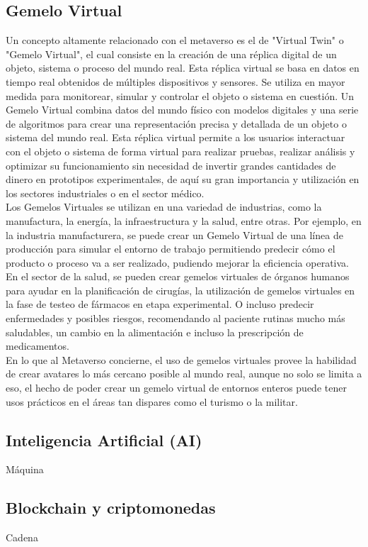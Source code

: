 \documentclass[a4paper,10pt]{article}
\begin{document}
	\subsection{Gemelo Virtual}
	Un concepto altamente relacionado con el metaverso es el de "Virtual Twin" o "Gemelo Virtual", el cual consiste en la creación de una réplica digital de un objeto, sistema o proceso del mundo real. Esta réplica virtual se basa en datos en tiempo real obtenidos de múltiples dispositivos y sensores. Se utiliza en mayor medida para monitorear, simular y controlar el objeto o sistema en cuestión.
	Un Gemelo Virtual combina datos del mundo físico con modelos digitales y una serie de algoritmos para crear una representación precisa y detallada de un objeto o sistema del mundo real. Esta réplica virtual permite a los usuarios interactuar con el objeto o sistema de forma virtual para realizar pruebas, realizar análisis y optimizar su funcionamiento sin necesidad de invertir grandes cantidades de dinero en prototipos experimentales, de aquí su gran importancia y utilización en los sectores industriales o en el sector médico.
	\\ Los Gemelos Virtuales se utilizan en una variedad de industrias, como la manufactura, la energía, la infraestructura y la salud, entre otras. Por ejemplo, en la industria manufacturera, se puede crear un Gemelo Virtual de una línea de producción para simular el entorno de trabajo permitiendo predecir cómo el producto o proceso va a ser realizado, pudiendo mejorar la eficiencia operativa. En el sector de la salud, se pueden crear gemelos virtuales de órganos humanos para ayudar en la planificación de cirugías, la utilización de gemelos virtuales en la fase de testeo de fármacos en etapa experimental. O incluso predecir enfermedades y posibles riesgos, recomendando al paciente rutinas mucho más saludables, un cambio en la alimentación e incluso la prescripción de medicamentos.
	\\ En lo que al Metaverso concierne, el uso de gemelos virtuales provee la habilidad de crear avatares lo más cercano posible al mundo real, aunque no solo se limita a eso, el hecho de poder crear un gemelo virtual de entornos enteros puede tener usos prácticos en el áreas tan dispares como el turismo o la militar. 
	\subsection{Inteligencia Artificial (AI)}
	Máquina
	\subsection{Blockchain y criptomonedas}
	Cadena
	
\end{document}
